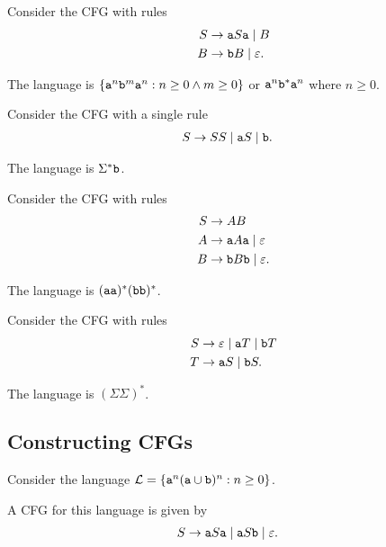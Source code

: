 \documentclass{notes}
\begin{document}
\begin{eg}
  Consider the CFG with rules 
  \begin{align*}
    S &\to \verb~a~ S \verb~a~ \; | \; B \\ 
    B &\to \verb~b~ B \; | \; \varepsilon.
  \end{align*}
  
  The language is $\left \{ \verb~a~^n \verb~b~^m \verb~a~^n : n \geq 0 \land m \geq 0 \right \}$ or $\verb~a~^n \verb~b~^* \verb~a~^n$ where $n \geq 0$.
\end{eg}

\begin{eg}
  Consider the CFG with a single rule 
  \begin{align*}
    S &\to SS \; | \; \verb~a~ S \; | \; \verb~b~.
  \end{align*}
  
  The language is $\Sigma^* \verb~b~$.
\end{eg}

\begin{eg}
  Consider the CFG with rules 
  \begin{align*}
    S &\to AB \\ 
    A &\to \verb~a~ A \verb~a~ \; | \; \varepsilon \\ 
    B &\to \verb~b~ B \verb~b~ \; | \; \varepsilon.
  \end{align*}
  
  The language is $(\verb~aa~)^* (\verb~bb~)^*$.
\end{eg}

\begin{eg}
  Consider the CFG with rules 
  \begin{align*}
    S &\to \varepsilon \; | \; \verb~a~ T \; | \; \verb~b~ T \\ 
    T &\to \verb~a~ S \; | \; \verb~b~ S.
  \end{align*}
  
  The language is $(\Sigma \Sigma)^*$.
\end{eg}

\newpage

\subsection{Constructing CFGs}

\begin{eg}
  Consider the language $\mathcal L = \left \{ \verb~a~^n (\verb~a~ \cup \verb~b~)^n : n \geq 0 \right \}$.
  
  A CFG for this language is given by
  \begin{align*}
    S &\to \verb~a~ S \verb~a~ \; | \; \verb~a~ S \verb~b~ \; | \; \varepsilon.
  \end{align*}
\end{eg}
\end{document}
